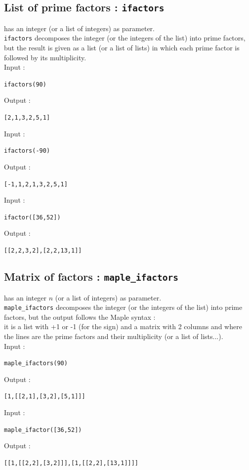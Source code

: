 \documentclass[a4paper,11pt]{book}
\begin{document}
\subsection{List of prime factors : {\tt ifactors}}
 has an integer (or a list of integers) as  parameter.\\
{\tt ifactors} decomposes the integer (or the integers of the list) into prime 
factors, but the result
 is given as a list (or a list of lists) in which each prime factor is
followed by its multiplicity.\\
Input :
\begin{center}{\tt ifactors(90) }\end{center}
Output :
\begin{center}{\tt [2,1,3,2,5,1] }\end{center}
Input :
\begin{center}{\tt ifactors(-90) }\end{center}
Output :
\begin{center}{\tt [-1,1,2,1,3,2,5,1] }\end{center}
Input :
\begin{center}{\tt ifactor([36,52]) }\end{center}
Output :
\begin{center}{\tt [[2,2,3,2],[2,2,13,1]]}\end{center}
\subsection{Matrix of factors : {\tt maple\_ifactors}}
 has an integer $n$ (or a list of integers)
as parameter.\\
{\tt maple\_ifactors} decomposes the integer (or the integers of the list) into
prime factors, but the output follows the Maple syntax :\\
it is a list with +1 or -1 (for the sign) and a matrix with 2 columns and
 where the lines are the prime factors and their multiplicity (or a list of 
lists...).\\
Input :
\begin{center}{\tt maple\_ifactors(90) }\end{center}
Output :
\begin{center}{\tt [1,[[2,1],[3,2],[5,1]]]}\end{center}
Input :
\begin{center}{\tt maple\_ifactor([36,52]) }\end{center}
Output :
\begin{center}{\tt [[1,[[2,2],[3,2]]],[1,[[2,2],[13,1]]]]}\end{center}
\end{document}
